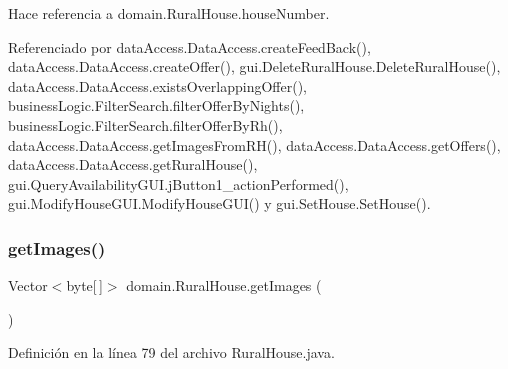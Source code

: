 \begin{DoxyCode}{0}

\end{DoxyCode}


Hace referencia a domain.\+Rural\+House.\+house\+Number.



Referenciado por data\+Access.\+Data\+Access.\+create\+Feed\+Back(), data\+Access.\+Data\+Access.\+create\+Offer(), gui.\+Delete\+Rural\+House.\+Delete\+Rural\+House(), data\+Access.\+Data\+Access.\+exists\+Overlapping\+Offer(), business\+Logic.\+Filter\+Search.\+filter\+Offer\+By\+Nights(), business\+Logic.\+Filter\+Search.\+filter\+Offer\+By\+Rh(), data\+Access.\+Data\+Access.\+get\+Images\+From\+R\+H(), data\+Access.\+Data\+Access.\+get\+Offers(), data\+Access.\+Data\+Access.\+get\+Rural\+House(), gui.\+Query\+Availability\+G\+U\+I.\+j\+Button1\+\_\+action\+Performed(), gui.\+Modify\+House\+G\+U\+I.\+Modify\+House\+G\+U\+I() y gui.\+Set\+House.\+Set\+House().

\mbox{\label{classdomain_1_1_rural_house_aa1acd38c652785b83bd4601d7ea5c761}} 
\subsubsection{\texorpdfstring{getImages()}{getImages()}}
{\footnotesize\ttfamily Vector$<$byte\mbox{[}$\,$\mbox{]}$>$ domain.\+Rural\+House.\+get\+Images (\begin{DoxyParamCaption}{ }\end{DoxyParamCaption})}



Definición en la línea 79 del archivo Rural\+House.\+java.


\begin{DoxyCode}{0}

\end{DoxyCode}


